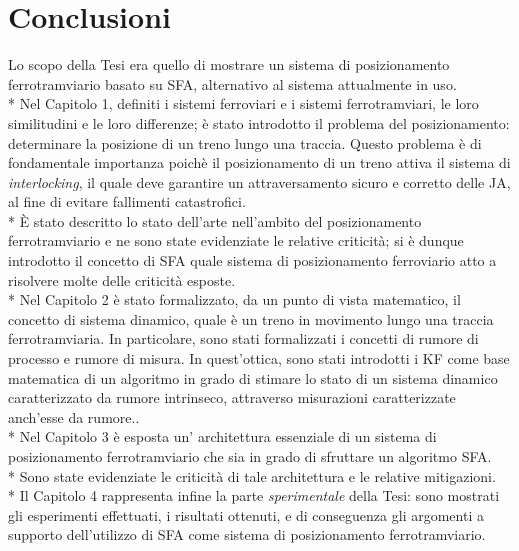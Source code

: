 \chapter{Conclusioni}
Lo scopo della Tesi era quello di mostrare un sistema di posizionamento ferrotramviario basato su SFA, alternativo al sistema attualmente in uso.\\*
Nel Capitolo 1, definiti i sistemi ferroviari e i sistemi ferrotramviari, le loro similitudini e le loro differenze; \`e stato introdotto il problema del posizionamento: determinare la posizione di un treno lungo una traccia. Questo problema \`e di fondamentale importanza poich\`e il posizionamento di un treno attiva il sistema di \emph{interlocking}, il quale deve garantire un attraversamento sicuro e corretto delle JA, al fine di evitare fallimenti catastrofici.\\*
\`E stato descritto lo stato dell'arte nell'ambito del posizionamento ferrotramviario e ne sono state evidenziate le relative criticit\`a; si \`e dunque introdotto il concetto di SFA quale sistema di posizionamento ferroviario atto a risolvere molte delle criticit\`a esposte.\\*
Nel Capitolo 2 \`e stato formalizzato, da un punto di vista matematico, il concetto di sistema dinamico, quale \`e un treno in movimento lungo una traccia ferrotramviaria. In particolare, sono stati formalizzati i concetti di rumore di processo e rumore di misura. In quest'ottica, sono stati introdotti i KF come base matematica di un algoritmo in grado di stimare lo stato di un sistema dinamico caratterizzato da rumore intrinseco, attraverso misurazioni caratterizzate anch'esse da rumore..\\*
Nel Capitolo 3 \`e esposta un' architettura essenziale di un sistema di posizionamento ferrotramviario che sia in grado di sfruttare un algoritmo SFA.\\*
Sono state evidenziate le criticit\`a di tale architettura e le relative mitigazioni.\\*
Il Capitolo 4 rappresenta infine la parte \emph{sperimentale} della Tesi: sono mostrati gli esperimenti effettuati, i risultati ottenuti, e di conseguenza gli argomenti a supporto dell'utilizzo di SFA come sistema di posizionamento ferrotramviario.
